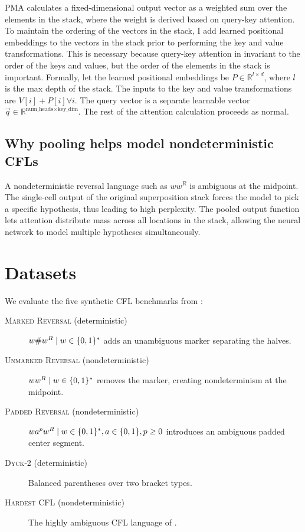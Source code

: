 PMA calculates a fixed-dimensional output vector as a weighted sum over the elements in the stack, where the weight is derived based on query-key attention. To maintain the ordering of the vectors in the stack, I add learned positional embeddings to the vectors in the stack prior to performing the key and value transformations. This is necessary because query-key attention in invariant to the order of the keys and values, but the order of the elements in the stack is important. Formally, let the learned positional embeddings be $P \in \mathbb{R}^{l\times d}$, where $l$ is the max depth of the stack. The inputs to the key and value transformations are $V[i] + P[i]  \forall i$. The query vector is a separate learnable vector $\vec{q} \in \mathbb{R}^{\text{num\_heads}\times\text{key\_dim}}$. The rest of the attention calculation proceeds as normal.

\subsection{Why pooling helps model nondeterministic CFLs}
A nondeterministic reversal language such as $ww^R$ is ambiguous at the midpoint. The single‑cell output of the original superposition stack forces the model to pick a specific hypothesis, thus leading to high perplexity. The pooled output function lets attention distribute mass across all locations in the stack, allowing the neural network to model multiple hypotheses simultaneously.


\section{Datasets}
We evaluate the five synthetic CFL benchmarks from \citet{dusell2024stack}:
\begin{description}
  \item[\textsc{Marked Reversal} (deterministic)] $\\{w\#w^R \mid w \in \{0,1\}^*\\}$ adds an unambiguous marker separating the halves.
  \item[\textsc{Unmarked Reversal} (nondeterministic)] $\\{ww^R \mid w \in \{0,1\}^*\\}$ removes the marker, creating nondeterminism at the midpoint.
  \item[\textsc{Padded Reversal} (nondeterministic)] $\\{w a^p w^R \mid w \in \{0,1\}^*, a \in \{0,1\}, p \ge 0\\}$ introduces an ambiguous padded center segment.
  \item[\textsc{Dyck‑2} (deterministic)] Balanced parentheses over two bracket types.
  \item[\textsc{Hardest CFL} (nondeterministic)] The highly ambiguous CFL language of \citet{doi:10.1137/0202025}.
\end{description}

